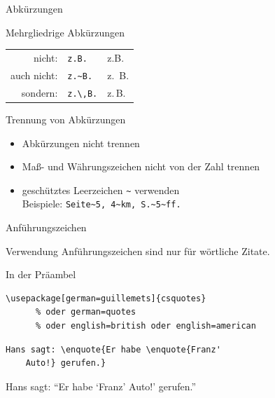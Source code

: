 \begin{Frame}[fragile]{Abkürzungen}
  \begin{Block}{Mehrgliedrige Abkürzungen}
    \begin{tabular}{rll}
      nicht: & \lstinline-z.B.- & z.B. \\
      auch nicht: & \lstinline-z.~B.- & z.~B. \\
      sondern: & \lstinline-z.\,B.- & z.\,B. \\
    \end{tabular}
  \end{Block}
  
  \begin{Block}{Trennung von Abkürzungen}
    \begin{itemize}
      \item Abkürzungen nicht trennen
      \item Maß- und Währungszeichen nicht von der Zahl trennen
      \item geschütztes Leerzeichen \lstinline-~- verwenden\\
        Beispiele: \lstinline-Seite~5, 4~km, S.~5~ff.-
    \end{itemize}
  \end{Block}
\end{Frame}

\begin{Frame}[fragile]{Anführungszeichen}
  \begin{alertblock}{Verwendung}
    Anführungszeichen sind nur für \alert{wörtliche Zitate}.
  \end{alertblock}
  
  \begin{Block}{In der Präambel}
    \begin{lstlisting}[gobble=6,style=block]
      \usepackage[german=guillemets]{csquotes}
      % oder german=quotes
      % oder english=british oder english=american
    \end{lstlisting}
  \end{Block}

  \begin{lstlisting}[gobble=4]
    Hans sagt: \enquote{Er habe \enquote{Franz'
    Auto!} gerufen.}
  \end{lstlisting}

  Hans sagt: \enquote{Er habe \enquote{Franz' Auto!} gerufen.}
\end{Frame}

